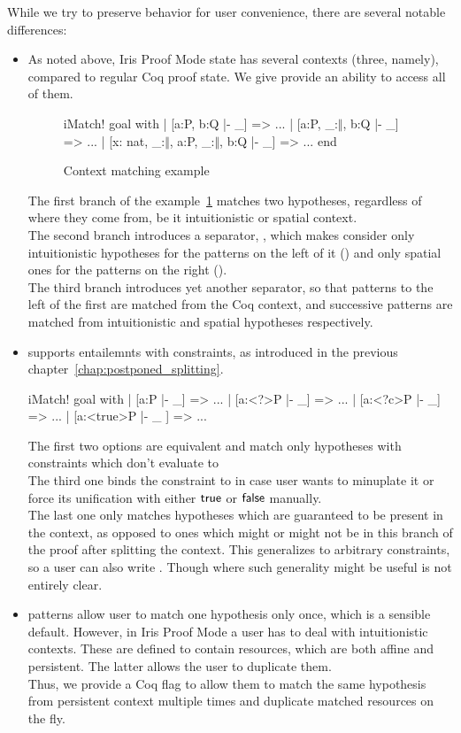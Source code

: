 While we try to preserve  behavior for user convenience, there are several notable differences:
\begin{itemize}
\item As noted above, Iris Proof Mode state has several contexts (three, namely), compared to regular Coq proof state.
  We give provide an ability to access all of them.
  \begin{figure}[H]
  \begin{coq}
       iMatch! goal with
       | [a:P, b:Q |- _] => ...
       | [a:P, _:$\Vert$, b:Q |- _] => ...
       | [x: nat, _:$\Vert$, a:P, _:$\Vert$, b:Q |- _] => ...
       end
   \end{coq}
   \caption{Context matching example}
   \label{fig:example:contex_matching}
  \end{figure}
  The first branch of the example~\ref{fig:example:contex_matching} matches two hypotheses, regardless of where they come from, be it intuitionistic or spatial context.\\
  The second branch introduces a separator, \coqe{_:$\Vert$}, which makes  consider only intuitionistic hypotheses for the patterns on the left of it () and only spatial ones for the patterns on the right ().\\
  The third branch introduces yet another separator, so that patterns to the left of the first \coqe{_:$\Vert$} are matched from the Coq context, and successive patterns are matched from intuitionistic and spatial hypotheses respectively.

\item {} supports entailemnts with constraints, as introduced in the previous chapter~\ref{chap:postponed_splitting}.
\begin{coq}
iMatch! goal with
| [a:P |- _] => ...
| [a:<?>P |- _] => ...
| [a:<?c>P |- _] => ...
| [a:<true>P |- _ ] => ...
\end{coq}
  The first two options are equivalent and match only hypotheses with constraints which don't evaluate to \false\\
  The third one binds the constraint to  in case user wants to minuplate it or force its unification with either $\textsf{true}$ or $\textsf{false}$ manually.\\
  The last one only matches hypotheses which are guaranteed to be present in the context, as opposed to ones which might or might not be in this branch of the proof after splitting the context.
  This generalizes to arbitrary constraints, so a user can also write .
  Though where such generality might be useful is not entirely clear.
\item {} patterns allow user to match one hypothesis only once, which is a sensible default.
  However, in Iris Proof Mode a user has to deal with intuitionistic contexts.
  These are defined to contain resources, which are both affine and persistent.
  The latter allows the user to duplicate them.\\
  Thus, we provide a Coq flag to allow them to match the same hypothesis from persistent context multiple times and duplicate matched resources on the fly.


\end{itemize}
